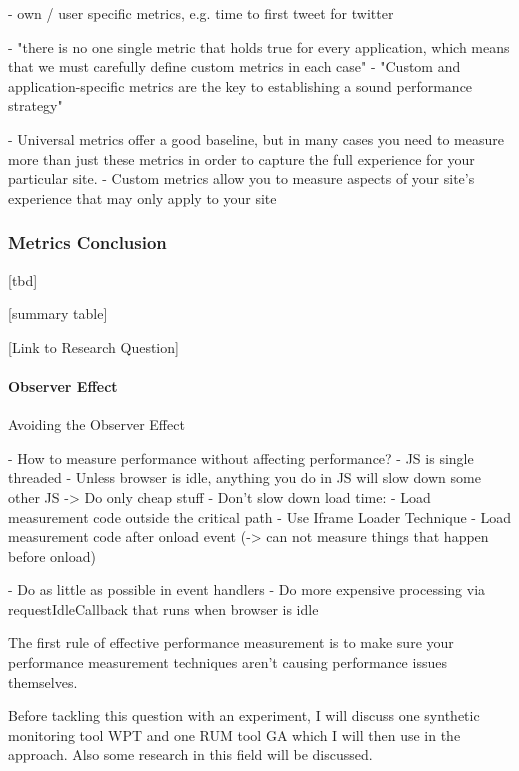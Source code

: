 - own / user specific metrics, e.g. time to first tweet for twitter 


- "there is no one single metric that holds true for every application, which means that we must carefully define custom metrics in each case"
-  "Custom and application-specific metrics are the key to establishing a sound performance strategy"


- Universal metrics offer a good baseline, but in many cases you need to measure more than just these metrics in order to capture the full experience for your particular site.
- Custom metrics allow you to measure aspects of your site's experience that may only apply to your site








\subsubsection{Metrics Conclusion}


[tbd]


[summary table]



[Link to Research Question]


\paragraph{Observer Effect}

Avoiding the Observer Effect

- How to measure performance without affecting performance?
- JS is single threaded
- Unless browser is idle, anything you do in JS will slow down some other JS
-> Do only cheap stuff
- Don't slow down load time:
	- Load measurement code outside the critical path
	- Use Iframe Loader Technique
	- Load measurement code after onload event (-> can not measure things that happen before onload)

- Do as little as possible in event handlers
- Do more expensive processing via requestIdleCallback that runs when browser is idle



The first rule of effective performance measurement is to make sure your performance measurement techniques aren't causing performance issues themselves.



Before tackling this question with an experiment, I will discuss one synthetic monitoring tool WPT and one RUM tool GA which I will then use in the approach.
Also some research in this field will be discussed.




